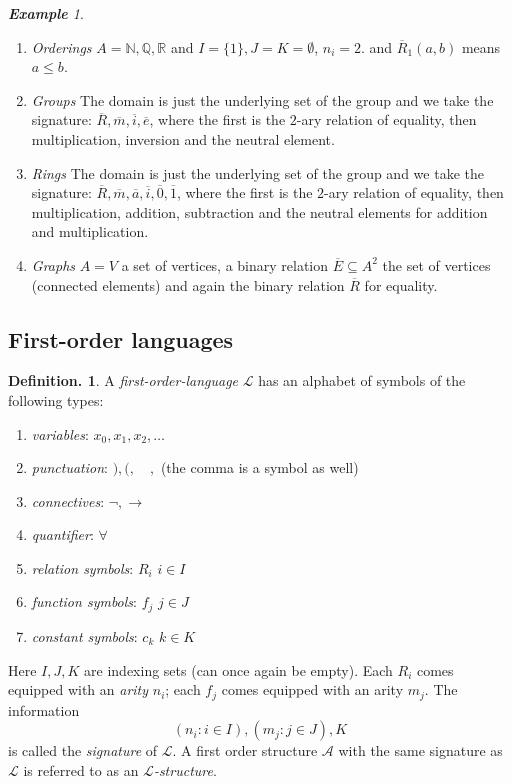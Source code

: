 \documentclass[a4paper,oneside,11pt,DIV=12,parskip=half]{scrartcl}
\newcommand{\R}{\mathbb R}
\newcommand{\N}{\mathbb N}
\theoremstyle{plain}
\theoremstyle{definition}
\newtheorem{definition}[theorem]{Definition.}
\newtheorem{remark, definition}[theorem]{Remark and Definition.}
\newtheorem{lemma, definition}[theorem]{Lemma and Definition.}
\newtheorem{theorem, definition}[theorem]{Theorem and Definition.}
\theoremstyle{remark}
\newtheorem*{example}{\textbf{Example}}
\newtheorem*{remark, example}{\textbf{Remark and Exercise}}
\begin{document}
\begin{example}
\begin{enumerate}
    \item \emph{Orderings}
    $A = \N, \mathbb{Q}, \R $ and $I = \{1\},J=K=\emptyset$, $n_i = 2$. and $\overline{R}_1(a,b)$ means $a\leq b$.
    \item \emph{Groups}
    The domain is just the underlying set of the group and we take the signature: $\overline{R},\overline{m},\overline{i},\overline{e}$, where the first is the $2$-ary relation of equality, then multiplication, inversion and the neutral element.
    \item \emph{Rings}
    The domain is just the underlying set of the group and we take the signature: $\overline{R},\overline{m},\overline{a},\overline{i},\overline{0},\overline{1}$, where the first is the $2$-ary relation of equality, then multiplication, addition, subtraction and the neutral elements for addition and multiplication.
    \item \emph{Graphs}
    $A = V$ a set of vertices, a binary relation $\overline{E} \subseteq A^2$ the set of vertices (connected elements) and again the binary relation $\overline{R}$ for equality.
\end{enumerate}
\end{example}

\subsection{First-order languages}
\begin{definition}
    A \emph{first-order-language} $\mathcal{L}$ has an alphabet of symbols of the following types:
    \begin{enumerate}
        \item \emph{variables}: $x_0,x_1,x_2,\dots$
        \item \emph{punctuation}: $),(,\quad ,$ (the comma is a symbol as well)
        \item \emph{connectives}: $\lnot, \rightarrow$
        \item \emph{quantifier}: $\forall$
        \item \emph{relation symbols}: $R_i$ $i \in I$
        \item \emph{function symbols}: $f_j$ $j \in J$
        \item \emph{constant symbols}: $c_k$ $k \in K$
    \end{enumerate}
    Here $I,J,K$ are indexing sets (can once again be empty). Each $R_i$ comes equipped with an \emph{arity} $n_i$; each $f_j$ comes equipped with an arity $m_j$.
    The information 
    \[ (n_i : i \in I), (m_j : j \in J), K \] is called the \emph{signature} of $\mathcal{L}$.
    A first order structure $\mathcal{A}$ with the same signature as $\mathcal{L}$  is referred to as an \emph{$\mathcal{L}$-structure}.
\end{definition}
\end{document}
